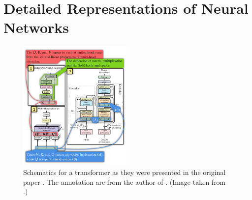\documentclass[11pt,a4paper,openright,twoside]{report}
\theoremstyle{plain}
\theoremstyle{definition}
\begin{document}
\chapter{Detailed Representations of Neural Networks}
\lhead[\fancyplain{}{\bfseries\thepage}]{\fancyplain{}{\bfseries\rightmark}}


\begin{figure}[h]
  \begin{center}
    \includegraphics[width=0.5\textwidth]{figures/transformer_original.png}     
    \caption[Diagram of a transformer]{Schematics for a transformer as they were presented in the original paper \cite{vaswani2017attention}. The annotation are from the author of \cite{abbott2024neural}. (Image taken from \cite{abbott2023robust}.)}
    \label{fig: transformer}
  \end{center}
\end{figure}
\end{document}
